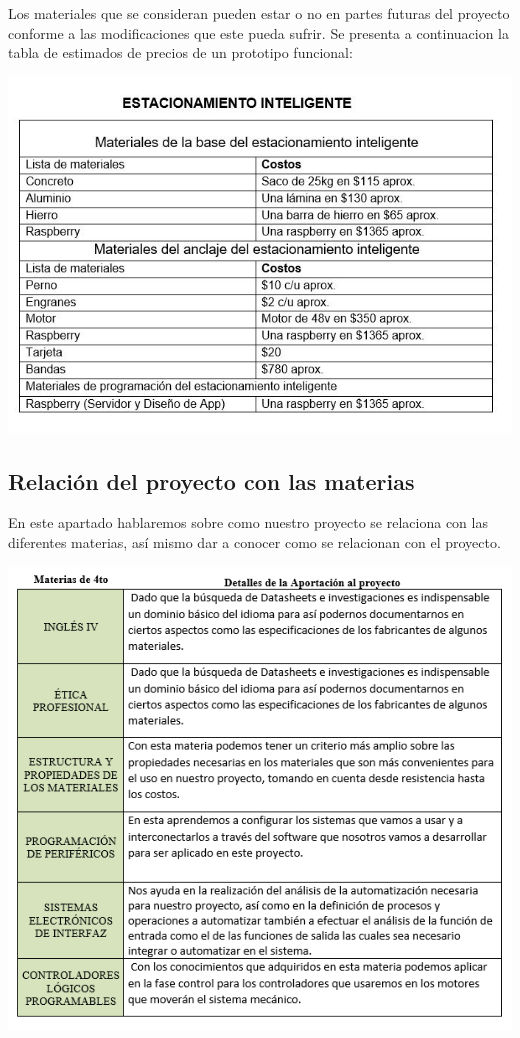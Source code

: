 \documentclass[11pt]{article}
\begin{document}
Los materiales que se consideran pueden estar o no en partes futuras del proyecto conforme a las modificaciones que este pueda sufrir. Se presenta a continuacion la tabla de estimados de precios de un prototipo funcional:

\begin{center}
\includegraphics[scale=0.8]{ImagenesDoc/costos.JPG} 
\end{center}
\label{}
\newpage
\subsection{Relación del proyecto con las materias}
\begin{flushleft}
En este apartado hablaremos sobre como nuestro proyecto se relaciona con las diferentes materias, así mismo dar a conocer como se relacionan con el proyecto.\\
\end{flushleft}
\begin{center}
\includegraphics[scale=1]{ImagenesDoc/Aportacionesmaterias.PNG} 
\end{center}
\end{document}
